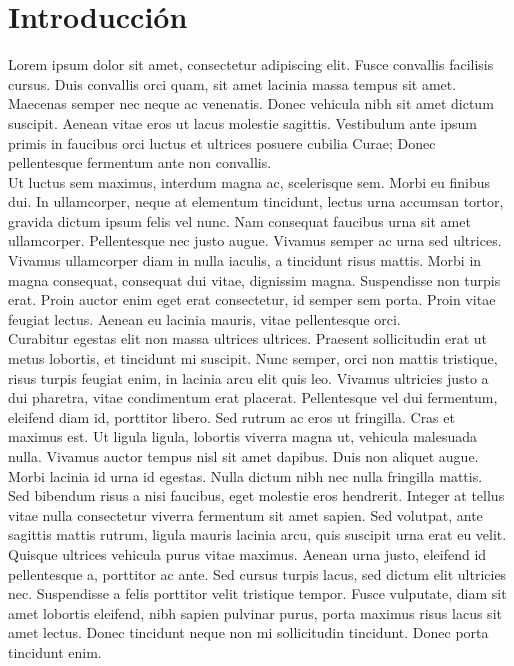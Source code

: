 

\chapter{Introducción}



Lorem ipsum dolor sit amet, consectetur adipiscing elit. Fusce convallis facilisis cursus. Duis convallis orci quam, sit amet lacinia massa tempus sit amet. Maecenas semper nec neque ac venenatis. Donec vehicula nibh sit amet dictum suscipit. Aenean vitae eros ut lacus molestie sagittis. Vestibulum ante ipsum primis in faucibus orci luctus et ultrices posuere cubilia Curae; Donec pellentesque fermentum ante non convallis.
\\

Ut luctus sem maximus, interdum magna ac, scelerisque sem. Morbi eu finibus dui. In ullamcorper, neque at elementum tincidunt, lectus urna accumsan tortor, gravida dictum ipsum felis vel nunc. Nam consequat faucibus urna sit amet ullamcorper. Pellentesque nec justo augue. Vivamus semper ac urna sed ultrices. Vivamus ullamcorper diam in nulla iaculis, a tincidunt risus mattis. Morbi in magna consequat, consequat dui vitae, dignissim magna. Suspendisse non turpis erat. Proin auctor enim eget erat consectetur, id semper sem porta. Proin vitae feugiat lectus. Aenean eu lacinia mauris, vitae pellentesque orci.
\\

Curabitur egestas elit non massa ultrices ultrices. Praesent sollicitudin erat ut metus lobortis, et tincidunt mi suscipit. Nunc semper, orci non mattis tristique, risus turpis feugiat enim, in lacinia arcu elit quis leo. Vivamus ultricies justo a dui pharetra, vitae condimentum erat placerat. Pellentesque vel dui fermentum, eleifend diam id, porttitor libero. Sed rutrum ac eros ut fringilla. Cras et maximus est. Ut ligula ligula, lobortis viverra magna ut, vehicula malesuada nulla. Vivamus auctor tempus nisl sit amet dapibus. Duis non aliquet augue. Morbi lacinia id urna id egestas. Nulla dictum nibh nec nulla fringilla mattis.
\\

Sed bibendum risus a nisi faucibus, eget molestie eros hendrerit. Integer at tellus vitae nulla consectetur viverra fermentum sit amet sapien. Sed volutpat, ante sagittis mattis rutrum, ligula mauris lacinia arcu, quis suscipit urna erat eu velit. Quisque ultrices vehicula purus vitae maximus. Aenean urna justo, eleifend id pellentesque a, porttitor ac ante. Sed cursus turpis lacus, sed dictum elit ultricies nec. Suspendisse a felis porttitor velit tristique tempor. Fusce vulputate, diam sit amet lobortis eleifend, nibh sapien pulvinar purus, porta maximus risus lacus sit amet lectus. Donec tincidunt neque non mi sollicitudin tincidunt. Donec porta tincidunt enim.
\\


